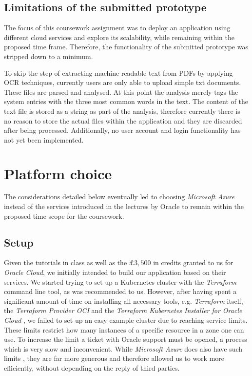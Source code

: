 \documentclass[conference]{IEEEtran}
\begin{document}
\subsection{Limitations of the submitted prototype}
\label{subsec:limits}
The focus of this coursework assignment was to deploy an application using different cloud services and explore its scalability, while remaining within the proposed time frame. Therefore, the functionality of the submitted prototype was stripped down to a minimum.

To skip the step of extracting machine-readable text from PDFs by applying OCR techniques, currently users are only able to upload simple txt documents. These files are parsed and analysed. At this point the analysis merely tags the system entries with the three most common words in the text. The content of the text file is stored as a string as part of the analysis, therefore currently there is no reason to store the actual files within the application and they are discarded after being processed. Additionally, no user account and login functionality has not yet been implemented.

\section{Platform choice}
\label{sec:platform-choice}
The considerations detailed below eventually led to choosing \textit{Microsoft Azure} instead of the services introduced in the lectures by Oracle to remain within the proposed time scope for the coursework.

\subsection{Setup}
\label{subsec:setup}
Given the tutorials in class as well as the $\pounds 3,500$ in credits granted to us for \textit{Oracle Cloud}, we initially intended to build our application based on their services. We started trying to set up a Kubernetes cluster with the \textit{Terraform} command line tool, as was recommended to us. However, after having spent a significant amount of time on installing all necessary tools, e.g. \textit{Terraform} itself, the \textit{Terraform Provider OCI}\cite{TerraformProviderOCI} and the \textit{Terraform Kubernetes Installer for Oracle Cloud} \cite{TerrafromK8sInstaller}, we failed to set up an easy example cluster due to reaching service limits. These limits restrict how many instances of a specific resource in a zone one can use. To increase the limit a ticket with Oracle support must be opened, a process which is very slow and inconvenient. While \textit{Microsoft Azure} does also have such limits \cite{AzureLimits}, they are far more generous and therefore allowed us to work more efficiently, without depending on the reply of third parties.
\end{document}
